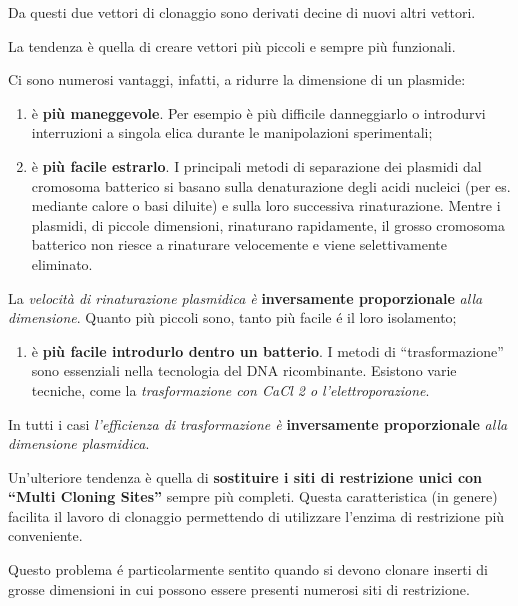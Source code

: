 \documentclass[11pt]{book}
\begin{document}
Da questi due vettori di clonaggio sono derivati decine di nuovi altri
vettori.

La tendenza è quella di creare vettori più piccoli e sempre più
funzionali.

Ci sono numerosi vantaggi, infatti, a ridurre la dimensione di un
plasmide:

\begin{enumerate}
\def\labelenumi{\arabic{enumi}.}
\itemsep1pt\parskip0pt
\item
  è \textbf{più maneggevole}. Per esempio è più difficile danneggiarlo o
  introdurvi interruzioni a singola elica durante le manipolazioni
  sperimentali;
\item
  è \textbf{più facile estrarlo}. I principali metodi di separazione dei
  plasmidi dal cromosoma batterico si basano sulla denaturazione degli
  acidi nucleici (per es. mediante calore o basi diluite) e sulla loro
  successiva rinaturazione. Mentre i plasmidi, di piccole dimensioni,
  rinaturano rapidamente, il grosso cromosoma batterico non riesce a
  rinaturare velocemente e viene selettivamente eliminato.
\end{enumerate}

La \emph{velocità di rinaturazione plasmidica è} \textbf{inversamente
proporzionale} \emph{alla dimensione}. Quanto più piccoli sono, tanto
più facile é il loro isolamento;

\begin{enumerate}
\def\labelenumi{\arabic{enumi}.}
\setcounter{enumi}{2}
\itemsep1pt\parskip0pt
\item
  è \textbf{più facile introdurlo dentro un batterio}. I metodi di
  ``trasformazione'' sono essenziali nella tecnologia del DNA
  ricombinante. Esistono varie tecniche, come la \emph{trasformazione
  con CaCl 2 o l'elettroporazione}.
\end{enumerate}

In tutti i casi \emph{l'efficienza di trasformazione è}
\textbf{inversamente proporzionale} \emph{alla dimensione plasmidica}.

Un'ulteriore tendenza è quella di \textbf{sostituire i siti di
restrizione unici con ``Multi Cloning Sites''} sempre più completi.
Questa caratteristica (in genere) facilita il lavoro di clonaggio
permettendo di utilizzare l'enzima di restrizione più conveniente.

Questo problema é particolarmente sentito quando si devono clonare
inserti di grosse dimensioni in cui possono essere presenti numerosi
siti di restrizione.
\end{document}

